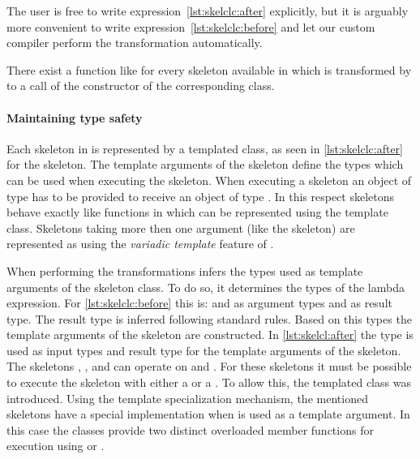The user is free to write expression~\ref{lst:skelclc:after} explicitly, but it is arguably more convenient to write expression~\ref{lst:skelclc:before} and let our custom compiler perform the transformation automatically.

There exist a function like  for every skeleton available in \SkelCL which is transformed by  to a call of the constructor of the corresponding class.

\paragraph{Maintaining type safety}
Each skeleton in \SkelCL is represented by a templated class, as seen in \autoref{lst:skelclc:after} for the \zip skeleton.
The template arguments of the skeleton define the types which can be used when executing the skeleton.
When executing a skeleton  an object of type  has to be provided to receive an object of type .
In this respect skeletons behave exactly like functions in \Cpp which can be represented using the  template class.
Skeletons taking more then one argument (like the  skeleton) are represented as  using the \emph{variadic template} feature of \Cpp.

When performing the transformations  infers the types used as template arguments of the skeleton class.
To do so, it determines the types of the lambda expression.
For \autoref{lst:skelclc:before} this is:  and  as argument types and  as result type.
The result type is inferred following standard \Cpp rules.
Based on this types the template arguments of the skeleton are constructed.
In \autoref{lst:skelcl:after} the type  is used as input types and result type for the template arguments of the \zip skeleton.
The skeletons \map, \zip, and \stencil can operate on  and .
For these skeletons it must be possible to execute the skeleton with either a  or a .
To allow this, the templated class  was introduced.
Using the template specialization mechanism, the mentioned skeletons have a special implementation when  is used as a template argument.
In this case the classes provide two distinct overloaded member functions for execution using  or .


